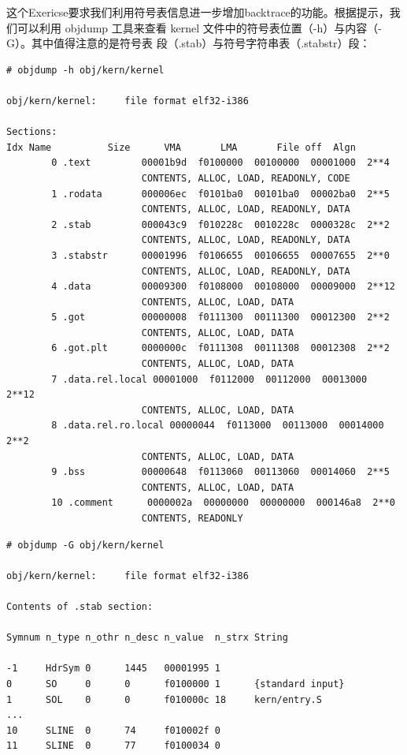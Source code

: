 \documentclass[12pt, letterpaper]{report}
\begin{document}
\quad \par 
这个Exericse要求我们利用符号表信息进一步增加backtrace的功能。根据提示，我们可以利用 
objdump 工具来查看 kernel 文件中的符号表位置（-h）与内容（-G）。其中值得注意的是符号表
段（.stab）与符号字符串表（.stabstr）段：
\quad \par
\lstset{style=MakeFileStyle}
\setmainfont{Consolas}
\begin{lstlisting}
# objdump -h obj/kern/kernel

obj/kern/kernel:     file format elf32-i386

Sections:
Idx Name          Size      VMA       LMA       File off  Algn
        0 .text         00001b9d  f0100000  00100000  00001000  2**4
                        CONTENTS, ALLOC, LOAD, READONLY, CODE
        1 .rodata       000006ec  f0101ba0  00101ba0  00002ba0  2**5
                        CONTENTS, ALLOC, LOAD, READONLY, DATA
        2 .stab         000043c9  f010228c  0010228c  0000328c  2**2
                        CONTENTS, ALLOC, LOAD, READONLY, DATA
        3 .stabstr      00001996  f0106655  00106655  00007655  2**0
                        CONTENTS, ALLOC, LOAD, READONLY, DATA
        4 .data         00009300  f0108000  00108000  00009000  2**12
                        CONTENTS, ALLOC, LOAD, DATA
        5 .got          00000008  f0111300  00111300  00012300  2**2
                        CONTENTS, ALLOC, LOAD, DATA
        6 .got.plt      0000000c  f0111308  00111308  00012308  2**2
                        CONTENTS, ALLOC, LOAD, DATA
        7 .data.rel.local 00001000  f0112000  00112000  00013000  2**12
                        CONTENTS, ALLOC, LOAD, DATA
        8 .data.rel.ro.local 00000044  f0113000  00113000  00014000  2**2
                        CONTENTS, ALLOC, LOAD, DATA
        9 .bss          00000648  f0113060  00113060  00014060  2**5
                        CONTENTS, ALLOC, LOAD, DATA
        10 .comment      0000002a  00000000  00000000  000146a8  2**0
                        CONTENTS, READONLY
\end{lstlisting}
\setmainfont{Times New Roman}
\quad \par
\newpage 
\lstset{style=MakeFileStyle}
\setmainfont{Consolas}
\begin{lstlisting}
# objdump -G obj/kern/kernel

obj/kern/kernel:     file format elf32-i386

Contents of .stab section:

Symnum n_type n_othr n_desc n_value  n_strx String

-1     HdrSym 0      1445   00001995 1
0      SO     0      0      f0100000 1      {standard input}
1      SOL    0      0      f010000c 18     kern/entry.S
...
10     SLINE  0      74     f010002f 0
11     SLINE  0      77     f0100034 0
\end{lstlisting}
\end{document}
